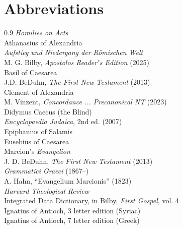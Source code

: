 \section*{Abbreviations}%
\vspace{2mm}%
\raggedright%
\vspace*{1mm}%
\begin{spacing}{0.9}
\textit{Homilies on Acts} \\%
Athanasius of Alexandria \\%
\textit{Aufstieg und Niedergang der Römischen Welt} \\%
M. G. Bilby, \textit{Apostolos Readerʼs Edition} (2025) \\%
Basil of Caesarea \\%
J.D. BeDuhn, \textit{The First New Testament} (2013) \\%
Clement of Alexandria \\%
M. Vinzent, \textit{Concordance ... Precanonical NT} (2023) \\%
Didymus Caecus (the Blind) \\%
\textit{Encyclopaedia Judaica}, 2nd ed. (2007) \\%
Epiphanius of Salamis \\%
Eusebius of Caesarea \\%
Marcionʼs \textit{Evangelion} \\%
J. D. BeDuhn, \textit{The First New Testament} (2013) \\%
\textit{Grammatici Graeci} (1867--) \\%
A. Hahn, “Evangelium Marcionis” (1823) \\%
\textit{Harvard Theological Review} \\%
Integrated Data Dictionary, in  Bilby, \textit{First Gospel}, vol. 4 \\%
Ignatius of Antioch, 3 letter edition (Syriac) \\%
Ignatius of Antioch, 7 letter edition (Greek) \\%

\end{spacing}
